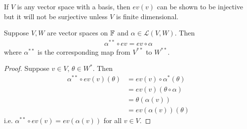\documentclass[a4paper]{article}
\begin{document}
\begin{rem}
If $V$ is any vector space with a basis, then $ev\left(v\right)$ can be shown to be injective but it will not be surjective unless $V$ is finite dimensional.
\end{rem}

\begin{lemma}
Suppose $V,W$ are vector spaces on $\mathbb{F}$ and $\alpha \in \mathcal{L}\left(V,W\right)$. Then
\begin{equation*}
\begin{aligned}
\alpha^{**} \circ ev = ev \circ \alpha
\end{aligned}
\end{equation*}
where $\alpha^{**}$ is the corresponding map from $V^{**}$ to $W^{**}$.
\begin{proof}
Suppose $v \in V$, $\theta \in W^*$. Then
\begin{equation*}
\begin{aligned}
\alpha^{**} \circ ev\left(v\right)\left(\theta\right) &= ev\left(v\right) \circ \alpha^* \left(\theta\right)\\
&= ev\left(v\right)\left(\theta\circ\alpha\right)\\
&= \theta\left(\alpha\left(v\right)\right)\\
&= ev\left(\alpha\left(v\right)\right)\left(\theta\right)
\end{aligned}
\end{equation*}
i.e. $\alpha^{**} \circ ev\left(v\right) = ev\left(\alpha\left(v\right)\right)$ for all $v\in V$.
\end{proof}
\end{lemma}
\end{document}

